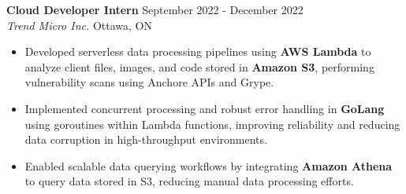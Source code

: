 \documentclass[a4paper]{article}
\begin{document}
\textbf{Cloud Developer Intern} \hfill September 2022 - December 2022\\
\textit{Trend Micro Inc.} \hfill Ottawa, ON\\
\vspace{-2mm}
\begin{itemize} \itemsep -4pt

\item Developed serverless data processing pipelines using \textbf{AWS Lambda} to analyze client files, images, and code stored in \textbf{Amazon S3}, performing vulnerability scans using Anchore APIs and Grype.

\item Implemented concurrent processing and robust error handling in \textbf{GoLang} using goroutines within Lambda functions, improving reliability and reducing data corruption in high-throughput environments.

\item Enabled scalable data querying workflows by integrating \textbf{Amazon Athena} to query data stored in S3, reducing manual data processing efforts.



\end{itemize}


\end{document}
